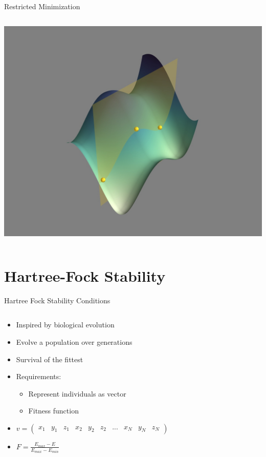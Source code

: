 \documentclass[10pt]{beamer}
\begin{document}
{{\begin{frame}{Restricted Minimization}
\begin{columns}[c]
\begin{column}{0.48\textwidth}
\begin{overprint}
				\includegraphics[width=0.9\linewidth, trim={7cm, 2cm, 7cm, 3cm}, clip]{../images/const_opt_nonstationary.jpeg}
			\end{overprint}
		\end{column}	
	\end{columns}
\end{frame}

\section{Hartree-Fock Stability}

{%
\begin{frame}{Hartree Fock Stability Conditions}
	\begin{columns}[c] %
		\begin{column}{.48\textwidth}
			\begin{itemize}
				\item {Inspired by biological evolution}
				\item {Evolve a population over generations}
				\item {Survival of the fittest}
				\item {Requirements:}
				\begin{itemize}
					\item {Represent individuals as vector}
					\item {Fitness function}
				\end{itemize}
				\item{$v = \left(\begin{smallmatrix}
					x_1 & y_1 & z_1 & x_2 &  y_2 & z_2 &
					... & x_N & y_N & z_N
					\end{smallmatrix}\right)$}
				\item{$F = \frac{E_{max} - E}{E_{max} - E_{min}}$}
			\end{itemize}


\end{column}
\end{columns}
\end{frame}}}}
\end{document}
